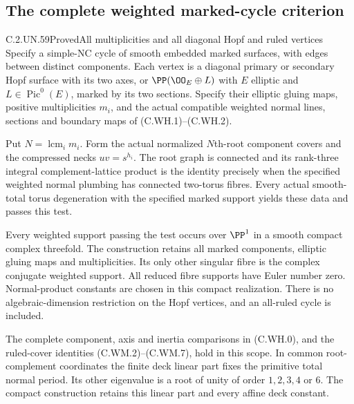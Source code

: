 \subsection{The complete weighted marked-cycle criterion}

\begin{statement}{C.2.UN.59}{Proved}{All multiplicities and all diagonal Hopf and ruled vertices}
Specify a simple-NC cycle of smooth embedded marked surfaces, with
edges between distinct components. Each vertex is a diagonal primary
or secondary Hopf surface with its two axes, or
$\PP(\OO_E\oplus L)$ with $E$ elliptic and
$L\in\operatorname{Pic}^0(E)$, marked by its two sections.
Specify their elliptic gluing maps, positive multiplicities $m_i$,
and the actual compatible weighted normal lines, sections and
boundary maps of (C.WH.1)--(C.WH.2).

Put $N=\operatorname{lcm}_i m_i$. Form the actual normalized
$N$th-root component covers and the compressed necks $uv=s^{h_i}$.
The root graph is connected and its rank-three integral
complement-lattice product is the identity precisely when the
specified weighted normal plumbing has connected two-torus fibres.
Every actual smooth-total torus degeneration with the specified
marked support yields these data and passes this test.

Every weighted support passing the test occurs over $\PP^1$ in a
smooth compact complex threefold. The construction retains all
marked components, elliptic gluing maps and multiplicities. Its
only other singular fibre is the complex conjugate weighted
support. All reduced fibre supports have Euler number zero.
Normal-product constants are chosen in this compact realization.
There is no algebraic-dimension restriction on the Hopf vertices,
and an all-ruled cycle is included.

The complete component, axis and inertia comparisons in
(C.WH.0), and the ruled-cover identities (C.WM.2)--(C.WM.7),
hold in this scope. In common root-complement coordinates the
finite deck linear part fixes the primitive total normal period.
Its other eigenvalue is a root of unity of order $1,2,3,4$ or $6$.
The compact construction retains this linear part and every
affine deck constant.
\end{statement}


